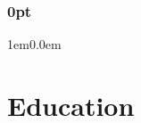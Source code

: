 
\titleformat{\section}{\raggedleft\sharedsec}{}{0em}{}
\titleformat{\subsubsection}{\raggedleft\sharedsubsubsec}{}{0em}{}
\titlespacing\subsubsection{0pt}{1em}{0.0em}

\setlength\parindent{0pt}


\newcommand{\gcal}{%
  {\small\textcolor{ltgray}\faCalendar\par}
}

\newcommand{\gcalmargin}[1]{%
  \begin{tcolorbox}[
  enhanced,
  colframe=white, 
  colback=white,
  halign=right, 
  boxrule=0em, 
  boxsep=0em,
  left=0em,top=0.0em,
  bottom=0.0em,
  right=-17pt,
  ]
  {#1}
  \end{tcolorbox}
}

\newcommand{\school}[4]{%
  \setlength\tabcolsep{3pt}
  \gcalmargin{%
  \begin{tabular}{rl}
  {\bf#1} & \ \\
  {#2} & \ \\
  {#3} & \gcal \\
  {#4} & \ 
  \end{tabular}
  }
}

\newcommand{\position}[3]{%
  \gcalmargin{%
  \begin{tabular}{rl}
  {\bf#1} & \ \\
  {#2} & \gcal \\
  {#3} & \ 
  \end{tabular}
  }
}

\section{Education}
